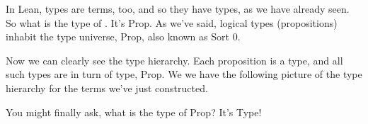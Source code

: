 \documentclass[letterpaper,10pt,english]{sphinxmanual}
\begin{document}
\begin{sphinxVerbatim}[commandchars=\\\{\}]
    

 
\end{sphinxVerbatim}

\sphinxAtStartPar
In Lean, types are terms, too, and so they have types, as we
have already seen. So what is the type of . It’s Prop.
As we’ve said, logical types (propositions) inhabit the type
universe, Prop, also known as Sort 0.

\begin{sphinxVerbatim}[commandchars=\\\{\}]
   
 
\end{sphinxVerbatim}

\sphinxAtStartPar
Now we can clearly see the type hierarchy. Each proposition
is a type, and all such types are in turn of type, Prop. We we
have the following picture of the type hierarchy for the
terms we’ve just constructed.

\begin{sphinxVerbatim}[commandchars=\\\{\}]
 

   
\end{sphinxVerbatim}

\sphinxAtStartPar
You might finally ask, what is the type of Prop? It’s Type!
\end{document}

